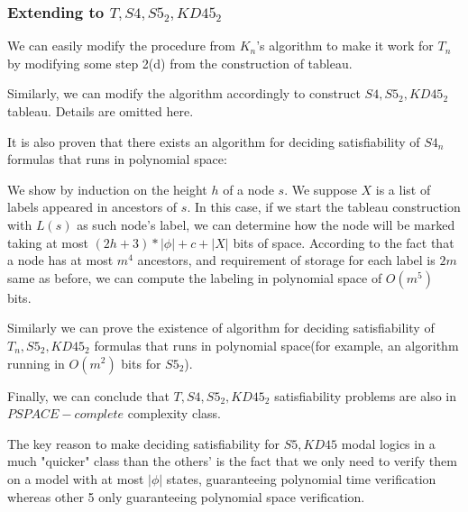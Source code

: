 \documentclass{article}
\begin{document}
\subsubsection{Extending to $T,S4,S5_2, KD45_2$}
\par We can easily modify the procedure from $K_n$'s algorithm to make it work for $T_n$ by modifying some step 2(d) from the construction of tableau.
\par Similarly, we can modify the algorithm accordingly to construct $S4, S5_2, KD45_2$ tableau. Details are omitted here.
\par It is also proven that there exists an algorithm for deciding satisfiability of $S4_n$ formulas that runs in polynomial space: 
\par We show by induction on the height $h$ of a node $s$. We suppose $X$ is a list of labels appeared in ancestors of $s$. In this case, if we start the tableau construction with $L(s)$ as such node's label, we can determine how the node will be marked taking at most $(2h+3)*|\phi|+c+|X|$ bits of space. According to the fact that a node has at most $m^4$ ancestors, and requirement of storage for each label is $2m$ same as before, we can compute the labeling in polynomial space of $O(m^5)$ bits.
\par Similarly we can prove the existence of algorithm for deciding satisfiability of $T_n, S5_2, KD45_2$ formulas that runs in polynomial space(for example, an algorithm running in $O(m^2)$ bits for $S5_2$).
\par Finally, we can conclude that $T,S4,S5_2, KD45_2$ satisfiability problems are also in $PSPACE-complete$ complexity class.
\par The key reason to make deciding satisfiability for $S5,KD45$ modal logics in a much "quicker" class than the others' is the fact that we only need to verify them on a model with at most $|\phi|$ states, guaranteeing polynomial time verification whereas other 5 only guaranteeing polynomial space verification.
\end{document}
